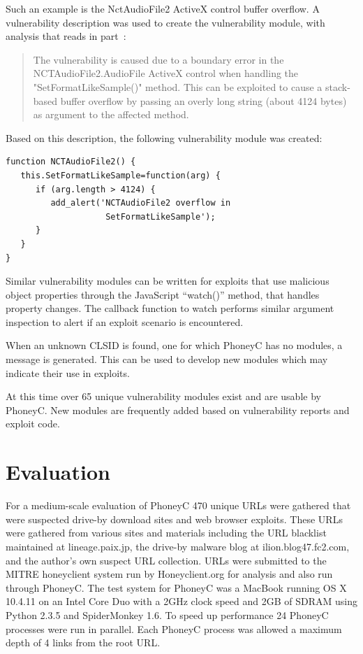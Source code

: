 \documentclass[10pt,twocolumn]{article}
\begin{document}
Such an example is the NctAudioFile2 ActiveX control buffer overflow. A vulnerability description was used to create the vulnerability module, with analysis that reads in part~\cite{secunia:nctaudiofile}:
\begin{quote}
The vulnerability is caused due to a boundary error in the NCTAudioFile2.AudioFile ActiveX control when handling the "SetFormatLikeSample()" method. This can be exploited to cause a stack-based buffer overflow by passing an overly long string (about 4124 bytes) as argument to the affected method.
\end{quote}
Based on this description, the following vulnerability module was created:
\scriptsize
\begin{verbatim}
function NCTAudioFile2() {
   this.SetFormatLikeSample=function(arg) {
      if (arg.length > 4124) {
         add_alert('NCTAudioFile2 overflow in 
                    SetFormatLikeSample');
      }
   }
}
\end{verbatim}
\normalsize
Similar vulnerability modules can be written for exploits that use malicious object properties through the JavaScript ``watch()'' method, that handles property changes. The callback function to watch performs similar argument inspection to alert if an exploit scenario is encountered.

When an unknown CLSID is found, one for which PhoneyC has no modules, a message is generated. This can be used to develop new modules which may indicate their use in exploits. 

At this time over 65 unique vulnerability modules exist and are usable by PhoneyC. New modules are frequently added based on vulnerability reports and exploit code. 

\section{Evaluation}
\label{evaluation}

For a medium-scale evaluation of PhoneyC 470 unique URLs were gathered that were suspected drive-by download sites and web browser exploits. These URLs were gathered from various sites and materials including the URL blacklist maintained at lineage.paix.jp, the drive-by malware blog at ilion.blog47.fc2.com, and the author's own suspect URL collection. URLs were submitted to the MITRE honeyclient system run by Honeyclient.org for analysis and also run through PhoneyC. The test system for PhoneyC was a MacBook running OS X 10.4.11 on an Intel Core Duo with a 2GHz clock speed and 2GB of SDRAM using Python 2.3.5 and SpiderMonkey 1.6. To speed up performance 24 PhoneyC processes were run in parallel. Each PhoneyC process was allowed a maximum depth of 4 links from the root URL. 
\end{document}
